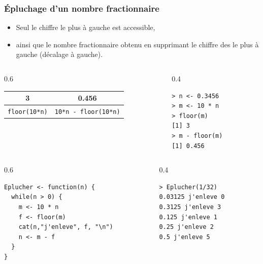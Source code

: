 \documentclass[10pt]{beamer}
\begin{document}
\begin{frame}[fragile]
  \frametitle{Épluchage d'un nombre fractionnaire}
  \begin{itemize}
  \item Seul le chiffre le plus à gauche est accessible,
  \item ainsi que le nombre fractionnaire obtenu en supprimant le chiffre des le plus à gauche (décalage à gauche).
  \end{itemize}

  \begin{columns}[c]
    \begin{column}{0.6\textwidth}
      \begin{center}
  \begin{tabular}{c|c}
    \toprule
    3                    & 0.456                         \\
    \midrule
    \texttt{floor(10*n)} & \texttt{10*n - floor(10*n)} \\
    \bottomrule
  \end{tabular}
\end{center}
\end{column}
\begin{column}{0.4\textwidth}
  \begin{lstlisting}
> n <- 0.3456
> m <- 10 * n
> floor(m)
[1] 3
> m - floor(m)
[1] 0.456
\end{lstlisting}
\end{column}
\end{columns}



\begin{columns}[t]
\begin{column}{0.6\textwidth}
\begin{lstlisting}[style=editor]
Eplucher <- function(n) {
  while(n > 0) {
    m <- 10 * n
    f <- floor(m)
    cat(n,"j'enleve", f, "\n")
    n <- m - f
  }
}
\end{lstlisting}
\end{column}
\begin{column}{0.4\textwidth}
\begin{lstlisting}
> Eplucher(1/32)
0.03125 j'enleve 0
0.3125 j'enleve 3
0.125 j'enleve 1
0.25 j'enleve 2
0.5 j'enleve 5
\end{lstlisting}
\end{column}
\end{columns}
\end{frame}
\end{document}
